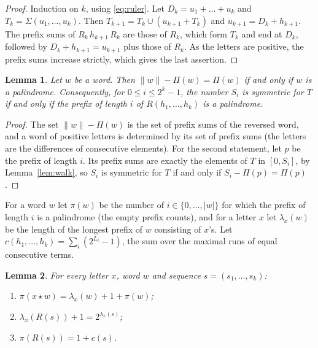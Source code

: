 \documentclass[11pt]{article}
\newtheorem{lemma}{Lemma}
\theoremstyle{remark}
\newcommand{\Sub}{\Sigma}
\begin{document}
\begin{proof}
Induction on $k$, using \eqref{eq:ruler}. Let $D_k=u_1+\dots+u_k$ and
$T_k=\Sub(u_1,\dots,u_k)$. Then $T_{k+1}=T_k\cup(u_{k+1}+T_k)$ and
$u_{k+1}=D_k+h_{k+1}$. The prefix sums of $R_k\,h_{k+1}\,R_k$ are those of
$R_k$, which form $T_k$ and end at $D_k$, followed by $D_k+h_{k+1}=u_{k+1}$
plus those of $R_k$. As the letters are positive, the prefix sums increase
strictly, which gives the last assertion.
\end{proof}

\begin{lemma}\label{lem:pal}
Let $w$ be a word. Then $\|w\|-\Pi(w)=\Pi(w)$ if and only if $w$ is a
palindrome. Consequently, for $0\le i\le 2^k-1$, the number $S_i$ is symmetric
for $T$ if and only if the prefix of length $i$ of $R(h_1,\dots,h_k)$ is a
palindrome.
\end{lemma}

\begin{proof}
The set $\|w\|-\Pi(w)$ is the set of prefix sums of the reversed word, and a
word of positive letters is determined by its set of prefix sums (the letters
are the differences of consecutive elements). For the second statement, let
$p$ be the prefix of length $i$. Its prefix sums are exactly the elements of
$T$ in $[0,S_i]$, by Lemma~\ref{lem:walk}, so $S_i$ is symmetric for $T$ if and
only if $S_i-\Pi(p)=\Pi(p)$.
\end{proof}

For a word $w$ let $\pi(w)$ be the number of $i\in\{0,\dots,|w|\}$ for which
the prefix of length $i$ is a palindrome (the empty prefix counts), and for a
letter $x$ let $\lambda_x(w)$ be the length of the longest prefix of $w$
consisting of $x$'s. Let $c(h_1,\dots,h_k)=\sum_i(2^{L_i}-1)$, the sum over the
maximal runs of equal consecutive terms.

\begin{lemma}\label{lem:palcount}
For every letter $x$, word $w$ and sequence $s=(s_1,\dots,s_k)$:
\begin{enumerate}
\item[(a)] $\pi(x\star w)=\lambda_x(w)+1+\pi(w)$;
\item[(b)] $\lambda_x(R(s))+1=2^{\lambda_x(s)}$;
\item[(c)] $\pi(R(s))=1+c(s)$.
\end{enumerate}
\end{lemma}
\end{document}
